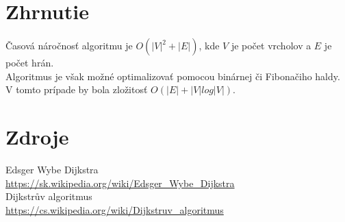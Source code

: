 \documentclass{beamer}
\begin{document}
\begin{frame}{\insertsectionhead}
\begin{center}
\begin{tikzpicture}[
			roundnode/.style={circle, draw=blue!60, fill=blue!5, very thick, minimum size=12mm},
			path/.style={very thick}
		]
		\end{tikzpicture}
	\end{center}
\end{frame}


\section{Zhrnutie}

\begin{frame}{\insertsectionhead}
	Časová náročnosť algoritmu je $O(|V|^2+|E|)$, kde $V$ je počet vrcholov a $E$ je počet hrán.\\
	\vspace{16pt}
	Algoritmus je však možné optimalizovať pomocou binárnej či Fibonačiho haldy. V tomto prípade by bola zložitosť $O(|E|+|V|log|V|)$.
\end{frame}


\section*{Zdroje}

\begin{frame}{\insertsectionhead}
	Edsger Wybe Dijkstra\\ \indent\footnotesize\url{https://sk.wikipedia.org/wiki/Edsger_Wybe_Dijkstra}\normalsize\\
	Dijkstrův algoritmus\\ \indent\footnotesize\url{https://cs.wikipedia.org/wiki/Dijkstruv_algoritmus}\normalsize\\
\end{frame}
\end{document}
